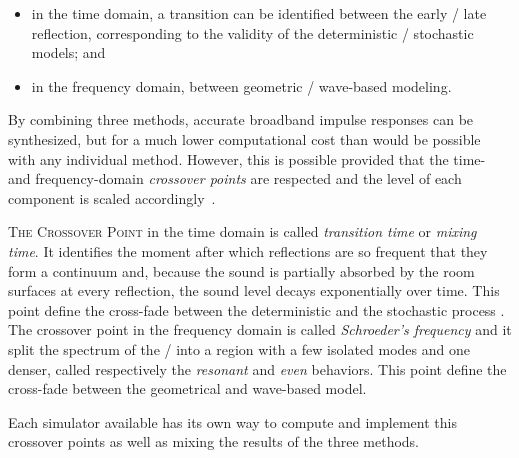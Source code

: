 \begin{itemize}
    \item in the time domain, a transition can be identified between the early \vs/ late reflection, corresponding to the validity of the deterministic \vs/ stochastic models; and
    \item in the frequency domain, between geometric \vs/ wave-based modeling.
\end{itemize}
By combining three methods, accurate broadband impulse responses can be synthesized,
but for a much lower computational cost than would be possible with any individual method.
However, this is possible provided that the time- and frequency-domain
\textit{crossover points} are respected and the level of each component is scaled accordingly~.

\textsc{The Crossover Point} in the time domain is called \textit{transition time} or \textit{mixing time}.
It identifies the moment after which reflections are so frequent that they form a continuum and,
because the sound is partially absorbed by the room surfaces at every reflection,
the sound level decays exponentially over time.
This point define the cross-fade between the deterministic and the stochastic process
.
\\The crossover point in the frequency domain is called \textit{Schroeder's frequency}
and it split the spectrum of the \RIR/ into a region with a few isolated modes and one denser,
called respectively the \textit{resonant} and \textit{even} behaviors.
This point define the cross-fade between the geometrical and wave-based model.

Each simulator available has its own way to compute and implement this crossover points as well as mixing the results of the three methods.

